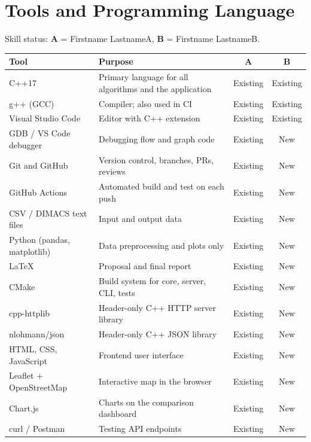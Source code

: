 \documentclass[11pt]{article}
\newcommand{\nameA}{Firstname LastnameA}
\newcommand{\nameB}{Firstname LastnameB}
\begin{document}
\section{Tools and Programming Language}
\noindent Skill status: \textbf{A} = \nameA, \textbf{B} = \nameB.
{\small
\begin{xltabular}{\textwidth}{@{}>{\raggedright\arraybackslash}p{0.30\textwidth} X c c@{}}
\toprule
\textbf{Tool} & \textbf{Purpose} & \textbf{A} & \textbf{B}\\
\midrule
\endhead
C++17 & Primary language for all algorithms and the application & Existing & Existing\\
g++ (GCC) & Compiler; also used in CI & Existing & Existing\\
Visual Studio Code & Editor with C++ extension & Existing & Existing\\
GDB / VS Code debugger & Debugging flow and graph code & Existing & New\\
Git and GitHub & Version control, branches, PRs, reviews & Existing & New\\
GitHub Actions & Automated build and test on each push & Existing & New\\
CSV / DIMACS text files & Input and output data & Existing & New\\
Python (pandas, matplotlib) & Data preprocessing and plots only & Existing & New\\
\LaTeX & Proposal and final report & Existing & New\\
CMake & Build system for core, server, CLI, tests & Existing & New\\
cpp-httplib & Header-only C++ HTTP server library & Existing & New\\
nlohmann/json & Header-only C++ JSON library & Existing & New\\
HTML, CSS, JavaScript & Frontend user interface & Existing & New\\
Leaflet + OpenStreetMap & Interactive map in the browser & Existing & New\\
Chart.js & Charts on the comparison dashboard & Existing & New\\
curl / Postman & Testing API endpoints & Existing & New\\
\bottomrule
\end{xltabular}}
\end{document}
